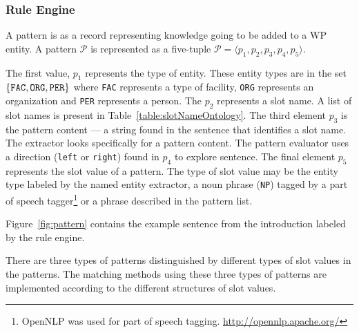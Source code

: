 \subsubsection{Rule Engine}

A pattern is as a record representing knowledge going to be added to a WP entity.
A pattern $\mathcal{P}$ is represented as a five-tuple $\mathcal{P} = \langle p_1, p_2, p_3, p_4, p_5 \rangle$.


The first value, $p_1$ represents the type of entity.
These entity types are in the set $\{\text{\tt FAC}, \text{\tt ORG}, \text{\tt PER} \}$ where \texttt{FAC} represents a type of facility, \texttt{ORG} represents an organization and \texttt{PER} represents a person.
The $p_2$ represents a slot name.
A list of slot names is present in Table~\ref{table:slotNameOntology}.
The third element $p_3$ is the pattern content --- 
a string found in the sentence that identifies a slot name.
The extractor looks specifically for a pattern content.
The pattern evaluator uses a direction (\texttt{left} or \texttt{right}) found in $p_4$ to explore sentence.
The final element $p_5$ represents the slot value of a pattern. 
The type of slot value may be the entity type labeled by the named entity extractor,
a noun phrase (\texttt{NP}) tagged by a part of speech tagger\footnote{OpenNLP was used for part of speech tagging. \url{http://opennlp.apache.org/}} or a phrase described in the pattern list.

Figure~\ref{fig:pattern} contains the example sentence from the introduction labeled by the rule engine.

There are three types of patterns distinguished by different types of slot values in the patterns.
The matching methods using these three types of patterns are implemented according to the different structures of slot values.

